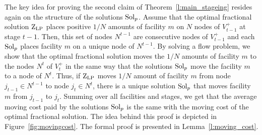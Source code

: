 


The key idea for proving the second claim of Theorem~\ref{l:main_stageing} resides again on the structure of the solutions $\mathrm{Sol}_p$.
Assume that the optimal fractional solution $\mathrm{Z}_{\mathrm{LP}}$ places positive $1/N$ amounts of facility $m$ on $N$ nodes of $V_{t-1}^+$ at stage $t-1$. Then, this set of nodes $N^{t-1}$ are consecutive nodes of $V_{t-1}^+$ and each $\mathrm{Sol}_p$ places facility $m$ on a unique node of $N^{t-1}$. By solving a flow problem, we show that the optimal fractional solution moves the $1/N$ amounts of facility $m$ to the nodes $N^{t}$ of $V_{t}^{+}$ in the same way that the solutions $\mathrm{Sol}_p$ move the facility $m$ to a node of $N^{t}$. Thus, if $\mathrm{Z}_{\mathrm{LP}}$ moves $1/N$ amount of facility $m$ from node $j_{t-1} \in N^{t-1}$ to node $j_t \in N^{t}$, there is a unique solution $\mathrm{Sol}_p$ that moves facility $m$ from $j_{t-1}$ to $j_{t}$.
Summing over all facilities and stages, we get that the average moving cost paid by the solutions $\mathrm{Sol}_p$ is the same with the moving cost of the optimal fractional solution. The idea behind this proof is depicted in Figure~\ref{fig:movingcost}. The formal proof is presented in Lemma~\ref{l:moving_cost}.


